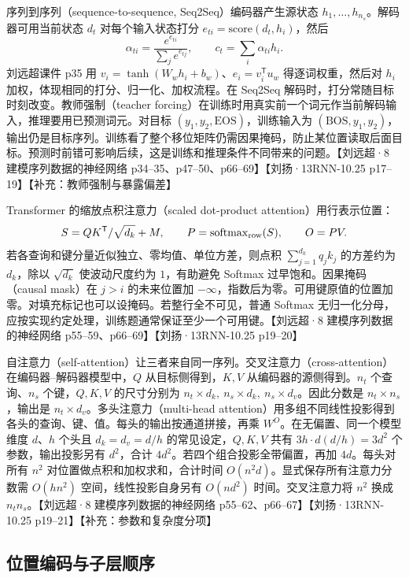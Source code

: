\documentclass[UTF8,a4paper,zihao=-4,fontset=fandol]{ctexrep}
\begin{document}
序列到序列（sequence-to-sequence, Seq2Seq）编码器产生源状态 $h_1,\dots,h_{n_s}$。解码器可用当前状态 $d_t$ 对每个输入状态打分 $e_{ti}=\mathrm{score}(d_t,h_i)$，然后
\[
 \alpha_{ti}=\frac{e^{e_{ti}}}{\sum_j e^{e_{tj}}},\qquad
 c_t=\sum_i\alpha_{ti}h_i.
\]
刘远超课件 p35 用 $v_i=\tanh(W_wh_i+b_w)$、$e_i=v_i^{\mathsf T}u_w$ 得逐词权重，然后对 $h_i$ 加权，体现相同的打分、归一化、加权流程。在 Seq2Seq 解码时，打分常随目标时刻改变。教师强制（teacher forcing）在训练时用真实前一个词元作当前解码输入，推理要用已预测词元。对目标 $(y_1,y_2,\mathrm{EOS})$，训练输入为 $(\mathrm{BOS},y_1,y_2)$，输出仍是目标序列。训练看了整个移位矩阵仍需因果掩码，防止某位置读取后面目标。预测时前错可影响后续，这是训练和推理条件不同带来的问题。【刘远超·8 建模序列数据的神经网络 p34--35、p47--50、p66--69】【刘扬·13RNN-10.25 p17--19】【补充：教师强制与暴露偏差】

Transformer 的缩放点积注意力（scaled dot-product attention）用行表示位置：
\[
 S=QK^{\mathsf T}/\sqrt{d_k}+M,\qquad
 P=\operatorname{softmax}_{\rm row}(S),\qquad O=PV .
\]
若各查询和键分量近似独立、零均值、单位方差，则点积 $\sum_{j=1}^{d_k}q_j k_j$ 的方差约为 $d_k$，除以 $\sqrt{d_k}$ 使波动尺度约为 $1$，有助避免 Softmax 过早饱和。因果掩码（causal mask）在 $j>i$ 的未来位置加 $-\infty$，指数后为零。可用键原值的位置加零。对填充标记也可以设掩码。若整行全不可见，普通 Softmax 无归一化分母，应按实现约定处理，训练题通常保证至少一个可用键。【刘远超·8 建模序列数据的神经网络 p55--59、p66--69】【刘扬·13RNN-10.25 p19--20】

自注意力（self-attention）让三者来自同一序列。交叉注意力（cross-attention）在编码器--解码器模型中，$Q$ 从目标侧得到，$K,V$ 从编码器的源侧得到。$n_t$ 个查询、$n_s$ 个键，$Q,K,V$ 的尺寸分别为 $n_t\times d_k,\ n_s\times d_k,\ n_s\times d_v$。因此分数是 $n_t\times n_s$，输出是 $n_t\times d_v$。多头注意力（multi-head attention）用多组不同线性投影得到各头的查询、键、值。每头的输出按通道拼接，再乘 $W^O$。在无偏置、同一个模型维度 $d$、$h$ 个头且 $d_k=d_v=d/h$ 的常见设定，$Q,K,V$ 共有 $3h\cdot d(d/h)=3d^2$ 个参数，输出投影另有 $d^2$，合计 $4d^2$。若四个组合投影全带偏置，再加 $4d$。每头对所有 $n^2$ 对位置做点积和加权求和，合计时间 $O(n^2d)$。显式保存所有注意力分数需 $O(hn^2)$ 空间，线性投影自身另有 $O(nd^2)$ 时间。交叉注意力将 $n^2$ 换成 $n_t n_s$。【刘远超·8 建模序列数据的神经网络 p55--62、p66--67】【刘扬·13RNN-10.25 p19--21】【补充：参数和复杂度分项】

\subsection*{位置编码与子层顺序}
\end{document}
